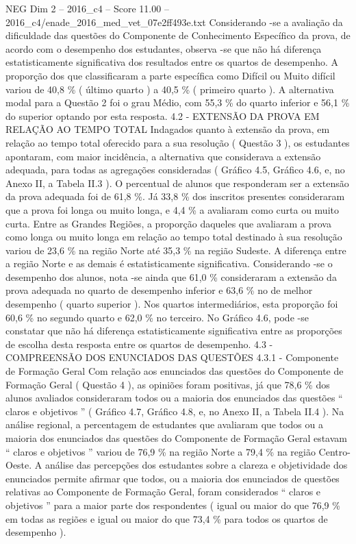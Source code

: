 \begin{textsample}{NEG Dim 2 – 2016\_c4 – Score 11.00 – 2016\_c4/enade\_2016\_med\_vet\_07e2ff493e.txt}
Considerando -se a avaliação da dificuldade das questões do Componente de Conhecimento Específico da prova, de acordo com o desempenho dos estudantes, observa -se que não há diferença estatisticamente significativa dos resultados entre os quartos de desempenho.
A proporção dos que classificaram a parte específica como Difícil ou Muito difícil variou de 40,8 \% ( último quarto ) a 40,5 \% ( primeiro quarto ).
A alternativa modal para a Questão 2 foi o grau Médio, com 55,3 \% do quarto inferior e 56,1 \% do superior optando por esta resposta. 4.2 - EXTENSÃO DA PROVA EM RELAÇÃO AO TEMPO TOTAL Indagados quanto à extensão da prova, em relação ao tempo total oferecido para a sua resolução ( Questão 3 ), os estudantes apontaram, com maior incidência, a alternativa que considerava a extensão adequada, para todas as agregações consideradas ( Gráfico 4.5, Gráfico 4.6, e, no Anexo II, a Tabela II.3 ).
O percentual de alunos que responderam ser a extensão da prova adequada foi de 61,8 \%.
Já 33,8 \% dos inscritos presentes consideraram que a prova foi longa ou muito longa, e 4,4 \% a avaliaram como curta ou muito curta.
Entre as Grandes Regiões, a proporção daqueles que avaliaram a prova como longa ou muito longa em relação ao tempo total destinado à sua resolução variou de 23,6 \% na região Norte até 35,3 \% na região Sudeste.
A diferença entre a região Norte e as demais é estatisticamente significativa.
Considerando -se o desempenho dos alunos, nota -se ainda que 61,0 \% consideraram a extensão da prova adequada no quarto de desempenho inferior e 63,6 \% no de melhor desempenho ( quarto superior ).
Nos quartos intermediários, esta proporção foi 60,6 \% no segundo quarto e 62,0 \% no terceiro.
No Gráfico 4.6, pode -se constatar que não há diferença estatisticamente significativa entre as proporções de escolha desta resposta entre os quartos de desempenho. 4.3 - COMPREENSÃO DOS ENUNCIADOS DAS QUESTÕES 4.3.1 - Componente de Formação Geral Com relação aos enunciados das questões do Componente de Formação Geral ( Questão 4 ), as opiniões foram positivas, já que 78,6 \% dos alunos avaliados consideraram todos ou a maioria dos enunciados das questões “ claros e objetivos ” ( Gráfico 4.7, Gráfico 4.8, e, no Anexo II, a Tabela II.4 ).
Na análise regional, a percentagem de estudantes que avaliaram que todos ou a maioria dos enunciados das questões do Componente de Formação Geral estavam “ claros e objetivos ” variou de 76,9 \% na região Norte a 79,4 \% na região Centro-Oeste.
A análise das percepções dos estudantes sobre a clareza e objetividade dos enunciados permite afirmar que todos, ou a maioria dos enunciados de questões relativas ao Componente de Formação Geral, foram considerados “ claros e objetivos ” para a maior parte dos respondentes ( igual ou maior do que 76,9 \% em todas as regiões e igual ou maior do que 73,4 \% para todos os quartos de desempenho ).

\end{textsample}
